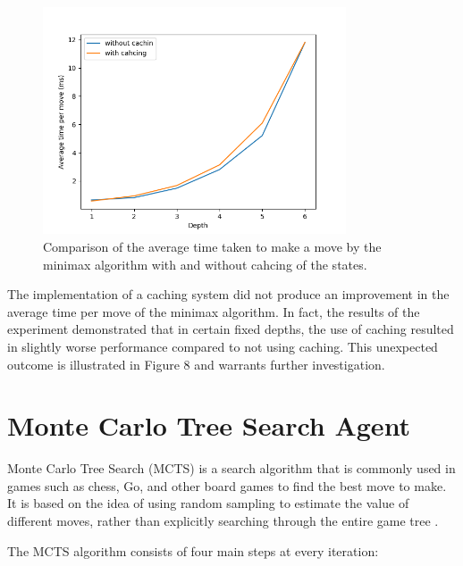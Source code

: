\begin{figure}[h]
  \centering
  \captionsetup{justification=centering}
  \includegraphics[width=0.8\textwidth]{../img/caching.png}
  \caption{Comparison of the average time taken to make a move by the minimax algorithm with and without cahcing of the states.}
  \label{WithWithoutAlphaBeta}
\end{figure}

The implementation of a caching system did not produce an improvement in the average time per move of the minimax algorithm. In fact, the results of the experiment demonstrated that in certain fixed depths, the use of caching resulted in slightly worse performance compared to not using caching. This unexpected outcome is illustrated in Figure 8 and warrants further investigation.

\section{Monte Carlo Tree Search Agent}
\label{MCTS}

Monte Carlo Tree Search (MCTS) is a search algorithm that is commonly used in games such as chess, Go, and other board games to find the best move to make. It is based on the idea of using random sampling to estimate the value of different moves, rather than explicitly searching through the entire game tree \citep{MCTSSurvey}.

The MCTS algorithm consists of four main steps at every iteration:

